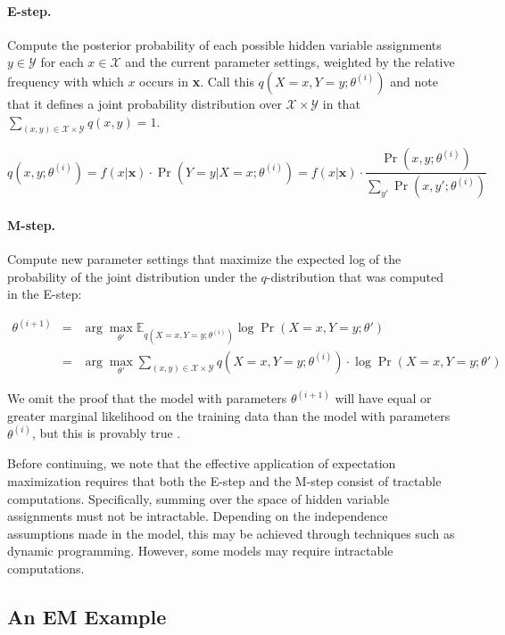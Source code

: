 \paragraph{\textbf{E-step.}}
Compute the posterior probability of each possible hidden variable
assignments $y \in \mathcal{Y}$ for each $x \in \mathcal{X}$ and the
current parameter settings, weighted by the relative frequency with
which $x$ occurs in \textbf{x}.  Call this $q(X=x,Y=y;\theta^{(i)})$
and note that it defines a joint probability distribution over
$\mathcal{X} \times \mathcal{Y}$ in that $\sum_{(x,y) \in \mathcal{X}
  \times \mathcal{Y}} q(x,y) = 1$.

\begin{equation}
q(x,y;\theta^{(i)}) = f(x|\textbf{x}) \cdot \Pr(Y=y|X=x;\theta^{(i)})
= f(x|\textbf{x}) \cdot \frac{\Pr(x,y;\theta^{(i)})}{\sum_{y'}
  \Pr(x,y';\theta^{(i)})}
\end{equation}

\paragraph{\textbf{M-step.}}
Compute new parameter settings that maximize the expected log of the
probability of the joint distribution under the $q$-distribution that
was computed in the E-step:

\begin{eqnarray*}
\theta^{(i+1)} &=& \arg \max_{\theta'} \mathbb{E}_{q(X=x,Y=y;\theta^{(i)})} \log \Pr(X=x,Y=y ; \theta') \\
& = & \arg \max_{\theta'} \sum_{(x,y) \in \mathcal{X} \times \mathcal{Y}} q(X=x,Y=y;\theta^{(i)}) \cdot \log \Pr(X=x,Y=y ; \theta')
\end{eqnarray*}

\noindent We omit the proof that the model with parameters
$\theta^{(i+1)}$ will have equal or greater marginal likelihood on the
training data than the model with parameters $\theta^{(i)}$, but this
is provably true \cite{Jelinek_1997}.

Before continuing, we note that the effective application of
expectation maximization requires that both the E-step and the M-step
consist of tractable computations.  Specifically, summing over the
space of hidden variable assignments must not be intractable.
Depending on the independence assumptions made in the model, this may
be achieved through techniques such as dynamic programming.  However,
some models may require intractable computations.

\subsection{An EM Example}

